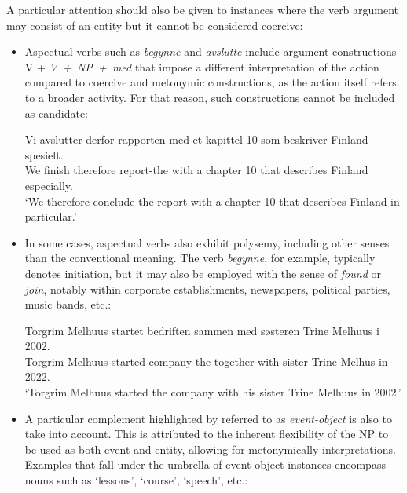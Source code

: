 \documentclass{article}
\begin{document}
A particular attention should also be given to instances where the verb argument may consist of an entity  but it cannot be considered coercive:
\begin{itemize}
    \item Aspectual verbs such as \emph{begynne} and \emph{avslutte} include argument constructions V + \mbox{\emph{V + NP + med}} that impose a different interpretation of the action compared to coercive and metonymic constructions, as the action itself refers to a broader activity. %
    For that reason, such constructions cannot be included as candidate:

        \ea %
        \gll Vi avslutter derfor rapporten med et kapittel 10 som beskriver Finland spesielt.\\
             We finish therefore report-the with a chapter 10 that describes Finland especially.\\
        \glt ‘We therefore conclude the report with a chapter 10 that describes Finland in particular.’
        \z

    \item In some cases, aspectual verbs also exhibit polysemy, including other senses than the conventional meaning. The verb \emph{begynne}, for example, typically denotes initiation, but it may also be employed with the sense of \emph{found} or \emph{join}, notably within corporate establishments, newspapers, political parties, music bands, etc.:

        \ea %
        \gll Torgrim Melhuus startet bedriften sammen med søsteren Trine Melhuus i 2002.\\
            Torgrim Melhuus started company-the together with sister Trine Melhus in 2022.\\
        \glt ‘Torgrim Melhuus started the company with his sister Trine Melhuus in 2002.’
        \z
        


    \item A particular complement highlighted by \textcite{verspoor_conventionality-governed_1997} referred to as \emph{event-object} is also to take into account. This is attributed to the inherent flexibility of the NP to be used as both event and entity, allowing for metonymically interpretations.  Examples that fall under the umbrella of event-object instances encompass nouns such as `lessons', `course', `speech', etc.: %


\end{itemize}
\end{document}

